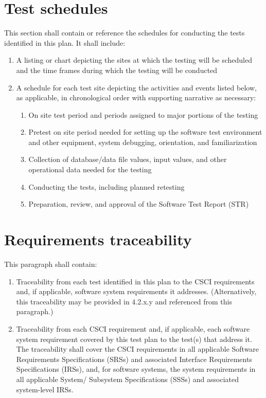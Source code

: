 \section{Test schedules}

This section shall contain or reference the schedules for conducting the
tests identified in this plan. It shall include:

\begin{enumerate}
\itemsep1pt\parskip0pt
\item
  A listing or chart depicting the sites at which the testing will be
  scheduled and the time frames during which the testing will be
  conducted
\item
  A schedule for each test site depicting the activities and events
  listed below, as applicable, in chronological order with supporting
  narrative as necessary:

  \begin{enumerate}
  \itemsep1pt\parskip0pt
  \item
    On site test period and periods assigned to major portions of the
    testing
  \item
    Pretest on site period needed for setting up the software test
    environment and other equipment, system debugging, orientation, and
    familiarization
  \item
    Collection of database/data file values, input values, and other
    operational data needed for the testing
  \item
    Conducting the tests, including planned retesting
  \item
    Preparation, review, and approval of the Software Test Report (STR)
  \end{enumerate}
\end{enumerate}

\section{Requirements traceability}

This paragraph shall contain:

\begin{enumerate}
\itemsep1pt\parskip0pt
\item
  Traceability from each test identified in this plan to the CSCI
  requirements and, if applicable, software system requirements it
  addresses. (Alternatively, this traceability may be provided in
  4.2.x.y and referenced from this paragraph.)
\item
  Traceability from each CSCI requirement and, if applicable, each
  software system requirement covered by this test plan to the test(s)
  that address it. The traceability shall cover the CSCI requirements in
  all applicable Software Requirements Specifications (SRSs) and
  associated Interface Requirements Specifications (IRSs), and, for
  software systems, the system requirements in all applicable System/
  Subsystem Specifications (SSSs) and associated system-level IRSs.
\end{enumerate}

